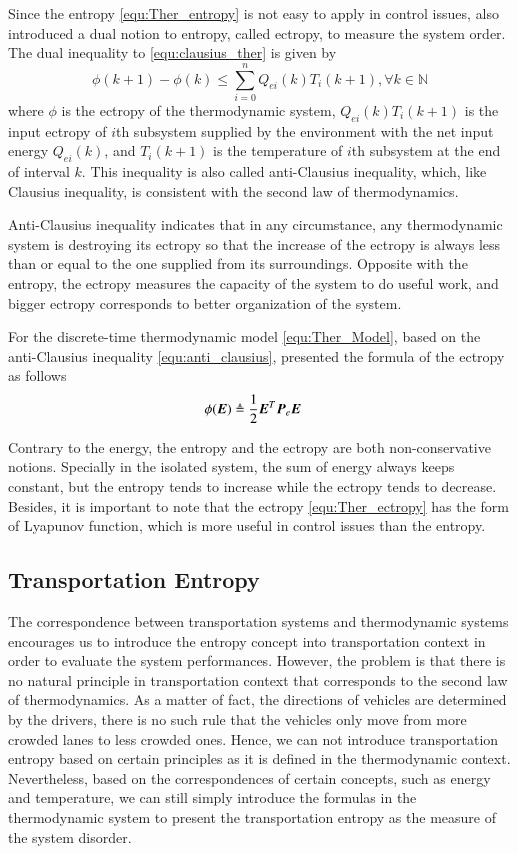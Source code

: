 \documentclass[preprint,authoryear,12pt]{elsarticle}
\renewcommand{\vec}[1]{\mbox{\boldmath$#1$}}
\newcommand{\mat}[1]{\mbox{\boldmath$#1$}}
\begin{document}
Since the entropy \eqref{equ:Ther_entropy} is not easy
to apply in control issues, \citet{haddad_thermodynamic_2005} also
introduced a dual notion to entropy, called ectropy, to measure the
system order. The dual inequality to \eqref{equ:clausius_ther} is
given by
\begin{equation}\label{equ:anti_clausius}
\phi(k+1)-\phi(k)\le \sum_{i=0}^n Q_{ei}(k)T_i(k+1),
\forall k\in\mathbb{N}
\end{equation}
where $\phi$ is the ectropy of the thermodynamic system,
$Q_{ei}(k)T_i(k+1)$ is the input ectropy of $i$th subsystem supplied
by the environment with the net input energy $Q_{ei}(k)$, and
$T_i(k+1)$ is the temperature of $i$th subsystem at the end of
interval $k$. This inequality is also called anti-Clausius
inequality, which, like Clausius inequality, is consistent with the
second law of thermodynamics.

Anti-Clausius inequality indicates that in any circumstance, any
thermodynamic system is destroying its ectropy so that the increase
of the ectropy is always less than or equal to the one supplied from
its surroundings. Opposite with the entropy, the ectropy measures the
capacity of the system to do useful work, and bigger ectropy
corresponds to better organization of the system.

For the discrete-time thermodynamic model \eqref{equ:Ther_Model},
based on the anti-Clausius inequality \eqref{equ:anti_clausius},
\citet{haddad_thermodynamic_2005} presented the formula of the
ectropy as follows
\begin{align}
\phi(\vec{E})&\triangleq\frac{1}{2}\vec{E}^T \mat{P}_e \vec{E}
\label{equ:Ther_ectropy}
\end{align}

Contrary to the energy, the entropy and the ectropy are both
non-conservative notions. Specially in the isolated system, the sum
of energy always keeps constant, but the entropy tends to increase
while the ectropy tends to decrease. Besides, it is important to note
that the ectropy \eqref{equ:Ther_ectropy} has the form of Lyapunov
function, which is more useful in control issues than the entropy.

\subsection{Transportation Entropy}
The correspondence between transportation systems and thermodynamic
systems encourages us to introduce the entropy concept into
transportation context in order to evaluate the system performances.
However, the problem is that there is no natural principle in
transportation context that corresponds to the second law of
thermodynamics. As a matter of fact, the directions of vehicles are
determined by the drivers, there is no such rule that the vehicles
only move from more crowded lanes to less crowded ones. Hence, we can
not introduce transportation entropy based on certain principles as
it is defined in the thermodynamic context. Nevertheless, based on
the correspondences of certain concepts, such as energy and
temperature, we can still simply introduce the formulas in the
thermodynamic system to present the transportation entropy as the
measure of the system disorder.
\end{document}
